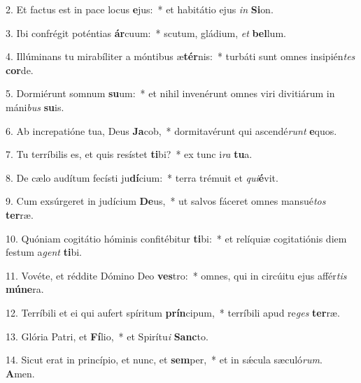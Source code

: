 2. Et factus est in pace locus \textbf{e}jus:~*  et habitátio ejus \textit{in} \textbf{Si}on.\

3. Ibi confrégit poténtias \textbf{ár}cuum:~*  scutum, gládium, \textit{et} \textbf{bel}lum.\

4. Illúminans tu mirabíliter a móntibus æ\textbf{tér}nis:~*  turbáti sunt omnes insipién\textit{tes} \textbf{cor}de.\

5. Dormiérunt somnum \textbf{su}um:~*  et nihil invenérunt omnes viri divitiárum in máni\textit{bus} \textbf{su}is.\

6. Ab increpatióne tua, Deus \textbf{Ja}cob,~*  dormitavérunt qui ascendé\textit{runt} \textbf{e}quos.\

7. Tu terríbilis es, et quis resístet \textbf{ti}bi?~*  ex tunc i\textit{ra} \textbf{tu}a.\

8. De cælo audítum fecísti ju\textbf{dí}cium:~*  terra trémuit et \textit{qui}\textbf{é}vit.\

9. Cum exsúrgeret in judícium \textbf{De}us,~*  ut salvos fáceret omnes mansué\textit{tos} \textbf{ter}ræ.\

10. Quóniam cogitátio hóminis confitébitur \textbf{ti}bi:~*  et relíquiæ cogitatiónis diem festum a\textit{gent} \textbf{ti}bi.\

11. Vovéte, et réddite Dómino Deo \textbf{ves}tro:~*  omnes, qui in circúitu ejus affér\textit{tis} \textbf{mú}\textbf{ne}ra.\

12. Terríbili et ei qui aufert spíritum \textbf{prín}cipum,~*  terríbili apud re\textit{ges} \textbf{ter}ræ.\

13. Glória Patri, et \textbf{Fí}lio,~*  et Spirítu\textit{i} \textbf{Sanc}to.\

14. Sicut erat in princípio, et nunc, et \textbf{sem}per,~*  et in sǽcula sæculó\textit{rum}. \textbf{A}men.\

